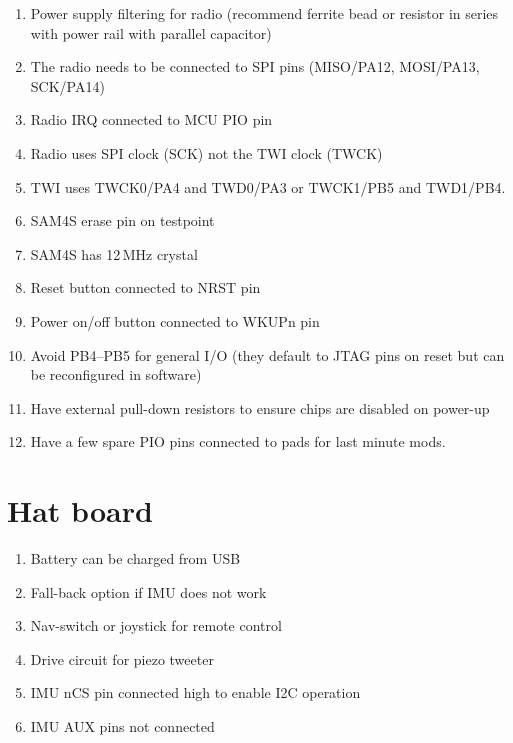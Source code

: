 \documentclass[a4paper, 12pt]{article}
\begin{document}
\begin{enumerate}
\item Power supply filtering for radio (recommend ferrite bead or
  resistor in series with power rail with parallel capacitor)

\item The radio needs to be connected to SPI pins (MISO/PA12,
  MOSI/PA13, SCK/PA14)

\item Radio IRQ connected to MCU PIO pin

\item Radio uses SPI clock (SCK) not the TWI clock (TWCK)

\item TWI uses TWCK0/PA4 and TWD0/PA3 or TWCK1/PB5 and TWD1/PB4.

\item SAM4S erase pin on testpoint

\item SAM4S has 12\,MHz crystal

\item Reset button connected to NRST pin

\item Power on/off button connected to WKUPn pin

\item Avoid PB4--PB5 for general I/O (they default to JTAG pins on
  reset but can be reconfigured in software)

\item Have external pull-down resistors to ensure chips are disabled on
  power-up

\item Have a few spare PIO pins connected to pads for last minute mods.

\end{enumerate}


\section{Hat board}

\begin{enumerate}
\item Battery can be charged from USB

\item Fall-back option if IMU does not work

\item Nav-switch or joystick for remote control

\item Drive circuit for piezo tweeter

\item IMU nCS pin connected high to enable I2C operation

\item IMU AUX pins not connected  
  
\end{enumerate}
\end{document}
